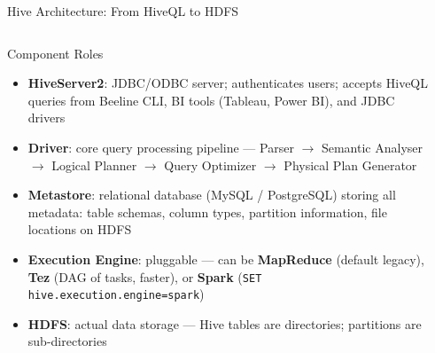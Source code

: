 \documentclass[aspectratio=169,10pt]{beamer}
\begin{document}
\begin{frame}{Hive Architecture: From HiveQL to HDFS}
  \begin{columns}[T]
      \begin{block}{Component Roles}
        {\small
        \begin{itemize}
          \item \textbf{HiveServer2}: JDBC/ODBC server; authenticates users; accepts HiveQL queries from Beeline CLI, BI tools (Tableau, Power BI), and JDBC drivers
          \item \textbf{Driver}: core query processing pipeline — Parser $\to$ Semantic Analyser $\to$ Logical Planner $\to$ Query Optimizer $\to$ Physical Plan Generator
          \item \textbf{Metastore}: relational database (MySQL / PostgreSQL) storing all metadata: table schemas, column types, partition information, file locations on HDFS
          \item \textbf{Execution Engine}: pluggable — can be \textbf{MapReduce} (default legacy), \textbf{Tez} (DAG of tasks, faster), or \textbf{Spark} (\texttt{SET hive.execution.engine=spark})
          \item \textbf{HDFS}: actual data storage — Hive tables are directories; partitions are sub-directories
        \end{itemize}
        }
      \end{block}

      \begin{center}
\end{center}
\end{columns}
\end{frame}
\end{document}
